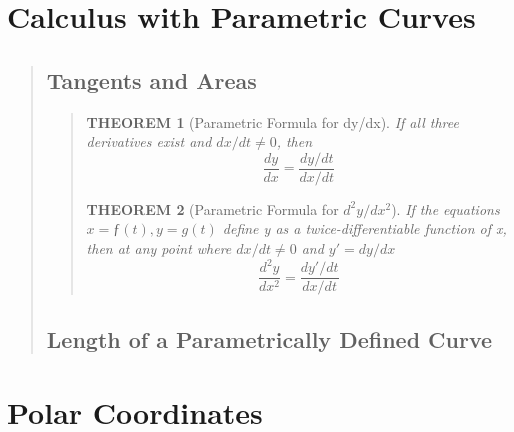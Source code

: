 \documentclass{report}
\newtheorem{theorem}{THEOREM}
\begin{document}
\section{Calculus with Parametric Curves }
\begin{quote}

	\subsection{Tangents and Areas}
	\begin{quote}

		\begin{theorem}[Parametric Formula for dy/dx]
			\mbox{}\par
			If all three derivatives exist and $dx/dt \neq 0$, then
			$$\frac{dy}{dx}=\frac{dy/dt}{dx/dt}$$
		\end{theorem}
		
		\begin{theorem}[Parametric Formula for $d^2y/dx^2$]
			\mbox{}\par
			If the equations $x = ƒ(t), y = g(t)$ define y as a twice-differentiable function of x, then at any point where $dx/dt \neq 0$ and $y' = dy/dx$
			$$\frac{d^2y}{dx^2}= \frac{dy'/dt}{dx/dt}$$
		\end{theorem}
		
	\end{quote}

	\subsection{Length of a Parametrically Defined Curve}

\end{quote}


\section{Polar Coordinates }
\begin{quote}

\end{quote}

\end{document}
